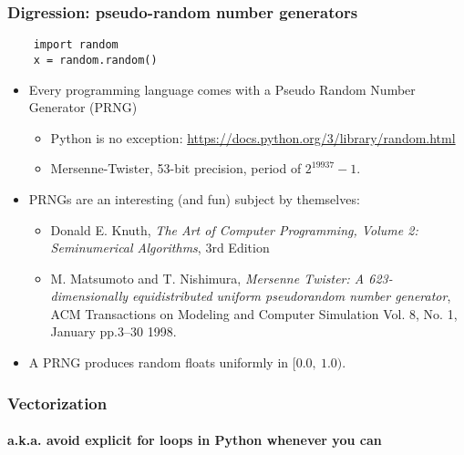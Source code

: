 \documentclass[9pt]{beamer}
\begin{document}
\begin{frame}[fragile]
  \frametitle{Digression: pseudo-random number generators}

  \begin{Verbatim}
    import random
    x = random.random()
  \end{Verbatim}

  \medskip
  
  \begin{itemize}
  \item Every programming language comes with a Pseudo Random Number
    Generator (PRNG)
    \begin{itemize}
    \item Python is no exception:
      \url{https://docs.python.org/3/library/random.html}
    \item Mersenne-Twister, 53-bit precision, period of $2^{19937} - 1$. 
    \end{itemize}
  \item PRNGs are an interesting (and fun) subject by themselves:
    \begin{itemize}
    \item Donald E. Knuth, \emph{The Art of Computer Programming, Volume 2: Seminumerical Algorithms}, 3rd Edition 
    \item M. Matsumoto and T. Nishimura, \emph{Mersenne Twister: A 623-dimensionally equidistributed uniform pseudorandom number generator}, ACM Transactions on Modeling and Computer Simulation Vol. 8, No. 1, January pp.3--30 1998.
    \end{itemize}
  \item A PRNG produces random floats uniformly in $[0.0,~1.0)$.
  \end{itemize}
\end{frame}


\begin{frame}
  \frametitle{Vectorization}
  \framesubtitle{a.k.a. avoid explicit for loops in Python whenever you can}
  
\end{frame}
\end{document}

